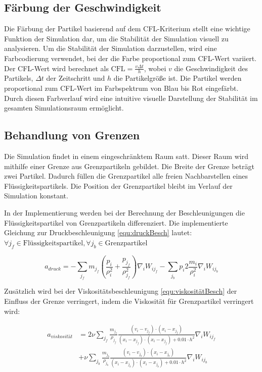 \documentclass[a4paper, 12pt]{article}
\begin{document}
\subsection{Färbung der Geschwindigkeit}
Die Färbung der Partikel basierend auf dem CFL-Kriterium stellt eine wichtige Funktion der Simulation dar, um die Stabilität der Simulation visuell zu analysieren. Um die Stabilität der Simulation darzustellen, wird eine Farbcodierung verwendet, bei der die Farbe proportional zum CFL-Wert variiert.
Der CFL-Wert wird berechnet als $\text{CFL} = \frac{v \Delta t}{h}$, wobei \(v\) die Geschwindigkeit des Partikels, \(\Delta t\) der Zeitschritt und \(h\) die Partikelgröße ist.
Die Partikel werden proportional zum CFL-Wert im Farbspektrum von Blau bis Rot eingefärbt. Durch diesen Farbverlauf wird eine intuitive visuelle Darstellung der Stabilität im gesamten Simulationsraum ermöglicht.
 
\subsection{Behandlung von Grenzen}
Die Simulation findet in einem eingeschränktem Raum satt. Dieser Raum wird mithilfe einer Grenze aus Grenzpartikeln gebildet. Die Breite der Grenze beträgt zwei Partikel. Dadurch füllen die Grenzpartikel alle freien Nachbarstellen eines Flüssigkeitspartikels. Die Position der  Grenzpartikel bleibt im Verlauf der Simulation konstant. 

In der Implementierung werden bei der Berechnung der Beschleunigungen die Flüssigkeitspartikel von Grenzpartikeln differenziert. Die implementierte Gleichung zur Druckbeschleunigung \eqref{equ:druckBesch} lautet: $\forall j_f \in \text{Flüssigkeitspartikel}, \forall j_b \in \text{Grenzpartikel}$ 

\begin{equation} \label{equ:druckBeschGrenze}
	a_{druck} = -\sum_{j_f} m_{j_f} \left( \frac{p_i}{\rho_i^2} + \frac{p_{j_f}}{\rho_{j_f}^2} \right) \nabla_i W_{i{j_f}} -\sum_{j_b} p_i 2\frac{m_i}{\rho_i^2} \nabla_i W_{i{j_b}}
\end{equation}

Zusätzlich wird bei der Viskositätsbeschleunigung \eqref{equ:viskositätBesch} der Einfluss der Grenze verringert, indem die Viskosität für Grenzpartikel verringert wird:

\begin{align}
	a_{viskosität} &= 2 \nu \sum_{j_f} \frac{m_{j_f}}{\rho_{j_f}} \frac{(v_i - v_{j_f}) \cdot (x_i - x_{j_f})}{(x_i - x_{j_f}) \cdot (x_i - x_{j_f}) + 0.01\cdot h^2} \nabla_i W_{i{j_f}} \nonumber \\
	&+ \nu \sum_{j_b} \frac{m_{j_b}}{\rho_{j_b}} \frac{(v_i - v_{j_b}) \cdot (x_i - x_{j_b})}{(x_i - x_{j_b}) \cdot (x_i - x_{j_b}) + 0.01\cdot h^2} \nabla_i W_{i{j_b}} \label{equ:viskositätBeschGrenze}
\end{align}
\end{document}
